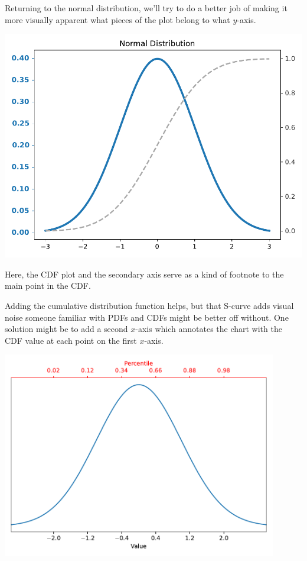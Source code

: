 Returning to the normal distribution, we'll try to do a better job of making it more visually apparent what pieces of the plot belong to what $y$-axis. 

\begin{center}
    \includegraphics[width = .7\textwidth]{figures/proseplots/dual-norm.pdf}
\end{center}


Here, the CDF plot and the secondary axis serve as a kind of footnote to the main point in the CDF. 


Adding the cumulative distribution function helps, but that S-curve adds visual noise someone familiar with PDFs and CDFs might be better off without. One solution might be to add a second $x$-axis which annotates the chart with the CDF value at each point on the first $x$-axis. 


\begin{center}
    \includegraphics[width = 0.9\textwidth]{figures/proseplots/dual-norm-b.pdf}
\end{center}

